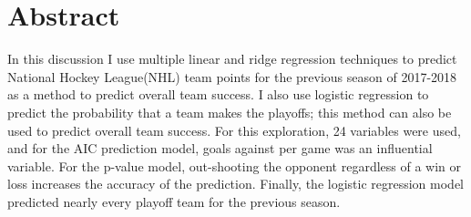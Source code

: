 \doublespacing
\chapter*{Abstract}
 In this discussion I use multiple linear and ridge regression techniques to predict National Hockey League(NHL) team points for the previous season of 2017-2018 as a method to predict overall team success. I also use logistic regression to predict the probability that a team makes the playoffs; this method can also be used to predict overall team success. For this exploration, 24 variables were used, and for the AIC prediction model, goals against per game was an influential variable. For the p-value model, out-shooting the opponent regardless of a win or loss increases the accuracy of the prediction. Finally, the logistic regression model predicted nearly every playoff team for the previous season.
